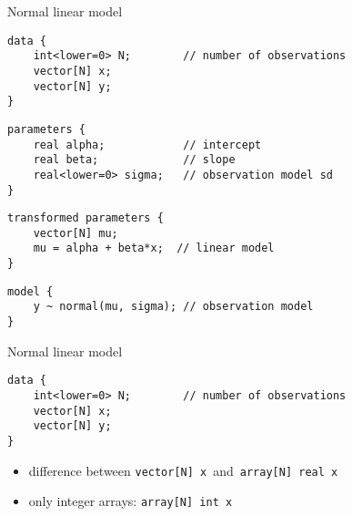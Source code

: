 \documentclass[finnish,english,t]{beamer}
\begin{document}
\begin{frame}[fragile]{Normal linear model}
  
  {\small
    {
  \begin{verbatim}
data {
    int<lower=0> N;        // number of observations
    vector[N] x; 
    vector[N] y;  
}
\end{verbatim}
    }
    \vspace{-1.5\baselineskip}
    {
\begin{verbatim}
parameters {
    real alpha;            // intercept
    real beta;             // slope
    real<lower=0> sigma;   // observation model sd
}
\end{verbatim}
    }
    \vspace{-1.5\baselineskip}
    {
\begin{verbatim}
transformed parameters {
    vector[N] mu;
    mu = alpha + beta*x;  // linear model
}
\end{verbatim}
    }
    \vspace{-1.5\baselineskip}
    {
\begin{verbatim}
model {
    y ~ normal(mu, sigma); // observation model
}
\end{verbatim}
    }
  }
  
\end{frame} 

\begin{frame}[fragile]{Normal linear model}
  
  {\small
  \begin{verbatim}
data {
    int<lower=0> N;        // number of observations
    vector[N] x; 
    vector[N] y;  
}
\end{verbatim}
  }

  \begin{itemize}
  \item difference between {\small\tt vector[N] x}\, and\, {\small\tt array[N] real x}
  \item<2-> only integer arrays: {\small\tt array[N] int x}
  \end{itemize}
  
\end{frame}
\end{document}

